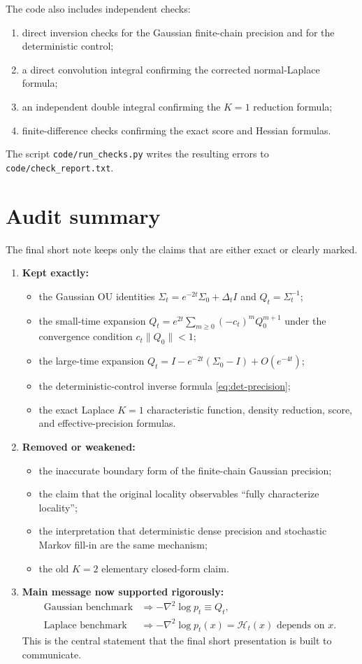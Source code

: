 \documentclass[11pt,a4paper]{article}
\newcommand{\Dt}{\Delta_t}
\newcommand{\Ht}{\mathcal{H}_t}
\begin{document}
The code also includes independent checks:
\begin{enumerate}[leftmargin=1.45em,itemsep=0.25em]
\item direct inversion checks for the Gaussian finite-chain precision and for the deterministic control;
\item a direct convolution integral confirming the corrected normal-Laplace formula;
\item an independent double integral confirming the $K=1$ reduction formula;
\item finite-difference checks confirming the exact score and Hessian formulas.
\end{enumerate}
The script \texttt{code/run\_checks.py} writes the resulting errors to \texttt{code/check\_report.txt}.

\section{Audit summary}

The final short note keeps only the claims that are either exact or clearly marked.
\begin{enumerate}[leftmargin=1.45em,itemsep=0.28em]
\item \textbf{Kept exactly:}
\begin{itemize}[leftmargin=1.2em]
\item the Gaussian OU identities $\Sigma_t=e^{-2t}\Sigma_0+\Dt I$ and $Q_t=\Sigma_t^{-1}$;
\item the small-time expansion $Q_t=e^{2t}\sum_{m\ge 0}(-c_t)^m Q_0^{m+1}$ under the convergence condition $c_t\|Q_0\|<1$;
\item the large-time expansion $Q_t=I-e^{-2t}(\Sigma_0-I)+O(e^{-4t})$;
\item the deterministic-control inverse formula \eqref{eq:det-precision};
\item the exact Laplace $K=1$ characteristic function, density reduction, score, and effective-precision formulas.
\end{itemize}
\item \textbf{Removed or weakened:}
\begin{itemize}[leftmargin=1.2em]
\item the inaccurate boundary form of the finite-chain Gaussian precision;
\item the claim that the original locality observables ``fully characterize locality'';
\item the interpretation that deterministic dense precision and stochastic Markov fill-in are the same mechanism;
\item the old $K=2$ elementary closed-form claim.
\end{itemize}
\item \textbf{Main message now supported rigorously:}
\[
\begin{aligned}
\text{Gaussian benchmark} &\Longrightarrow -\nabla^2 \log p_t \equiv Q_t,\\
\text{Laplace benchmark} &\Longrightarrow -\nabla^2 \log p_t(x) = \Ht(x) \text{ depends on } x.
\end{aligned}
\]
This is the central statement that the final short presentation is built to communicate.
\end{enumerate}
\end{document}
